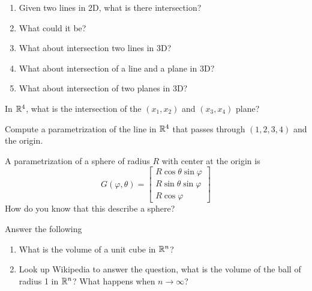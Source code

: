 \documentclass[12pt]{amsart}
\begin{document}
\begin{question}
    \begin{enumerate}
        \item Given two lines in 2D, what is there intersection? 
        \item What could it be?
        \item What about intersection two lines in 3D?
        \item What about intersection of a line and a plane in 3D?
        \item What about intersection of two planes in 3D?
    \end{enumerate}
\end{question}

\begin{question}
    In $\mathbb{R}^4$, what is the intersection of the $(x_1, x_2)$ and $(x_3, x_4)$ plane?
\end{question}

\begin{question}
    Compute a parametrization of the line in $\mathbb{R}^4$ that passes through $(1,2,3,4)$ and the origin.
\end{question}

\begin{question}
    A parametrization of a sphere of radius $R$ with center at the origin is
    \begin{equation*}
        G(\varphi, \theta) = \begin{bmatrix}
            R \cos \theta \sin \varphi \\
            R \sin \theta \sin \varphi \\
            R \cos \varphi
        \end{bmatrix}
    \end{equation*}
    How do you know that this describe a sphere?
\end{question}

\begin{question}
    Answer the following
    \begin{enumerate}
        \item What is the volume of a unit cube in $\mathbb{R}^n$?
        \item Look up Wikipedia to answer the question,
    what is the volume of the ball of radius 1 in $\mathbb{R}^n$?
    What happens when $n\to \infty$?
    \end{enumerate}

\end{question}

\printbibliography 
%
%
\end{document}
